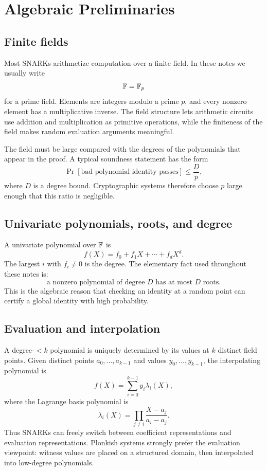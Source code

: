 \section{Algebraic Preliminaries}
\label{sec:algebra-preliminaries}

\subsection{Finite fields}

Most SNARKs arithmetize computation over a finite field. In these notes we usually write
\[
    \mathbb{F}=\mathbb{F}_p
\]
for a prime field. Elements are integers modulo a prime $p$, and every nonzero element has a multiplicative inverse. The field structure lets arithmetic circuits use addition and multiplication as primitive operations, while the finiteness of the field makes random evaluation arguments meaningful.

The field must be large compared with the degrees of the polynomials that appear in the proof. A typical soundness statement has the form
\[
    \Pr[\text{bad polynomial identity passes}]\le \frac{D}{p},
\]
where $D$ is a degree bound. Cryptographic systems therefore choose $p$ large enough that this ratio is negligible.

\subsection{Univariate polynomials, roots, and degree}

A univariate polynomial over $\mathbb{F}$ is
\[
    f(X)=f_0+f_1X+\cdots+f_dX^d.
\]
The largest $i$ with $f_i\neq 0$ is the degree. The elementary fact used throughout these notes is:
\[
    \text{a nonzero polynomial of degree }D\text{ has at most }D\text{ roots.}
\]
This is the algebraic reason that checking an identity at a random point can certify a global identity with high probability.

\subsection{Evaluation and interpolation}

A degree-$<k$ polynomial is uniquely determined by its values at $k$ distinct field points. Given distinct points $a_0,\ldots,a_{k-1}$ and values $y_0,\ldots,y_{k-1}$, the interpolating polynomial is
\[
    f(X)=\sum_{i=0}^{k-1} y_i\lambda_i(X),
\]
where the Lagrange basis polynomial is
\[
    \lambda_i(X)=\prod_{j\neq i}\frac{X-a_j}{a_i-a_j}.
\]
Thus SNARKs can freely switch between coefficient representations and evaluation representations. Plonkish systems strongly prefer the evaluation viewpoint: witness values are placed on a structured domain, then interpolated into low-degree polynomials.

